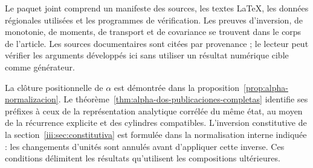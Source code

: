 Le paquet joint comprend un manifeste des sources, les textes LaTeX,
les données régionales utilisées et les programmes de vérification. Les preuves
d’inversion, de monotonie, de moments, de transport et de covariance se trouvent
dans le corps de l’article. Les sources documentaires sont citées par
provenance ; le lecteur peut vérifier les arguments développés ici
sans utiliser un résultat numérique cible comme générateur.

La clôture positionnelle de $\alpha$ est démontrée dans la
proposition~\ref{prop:alpha-normalizacion}. Le
théorème~\ref{thm:alpha-dos-publicaciones-completas} identifie ses
préfixes à ceux de la représentation analytique corrélée du même
état, au moyen de la récurrence explicite et des cylindres compatibles.
L’inversion constitutive de
la section~\ref{iii:sec:constitutiva} est formulée dans la normalisation
interne indiquée : les changements d’unités sont annulés avant d’appliquer
cette inverse. Ces conditions délimitent les résultats qu’utilisent
les compositions ultérieures.
